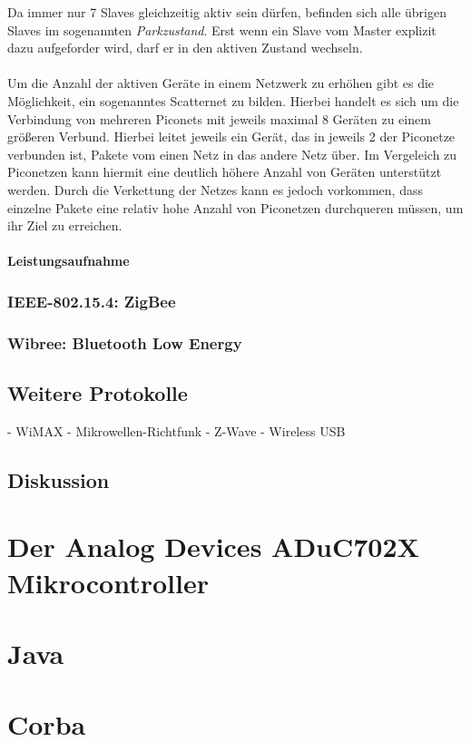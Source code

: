             Da immer nur 7 Slaves gleichzeitig aktiv sein dürfen, befinden sich 
            alle übrigen Slaves im sogenannten \textsl{Parkzustand}. Erst wenn
            ein Slave vom Master explizit dazu aufgeforder wird, darf er in den
            aktiven Zustand wechseln. \\
            \\
            Um die Anzahl der aktiven Geräte in einem Netzwerk zu erhöhen
            gibt es die Möglichkeit, ein sogenanntes Scatternet zu bilden.
            Hierbei handelt es sich um die Verbindung von mehreren Piconets
            mit jeweils maximal 8 Geräten zu einem größeren Verbund. Hierbei
            leitet jeweils ein Gerät, das in jeweils 2 der Piconetze 
            verbunden ist, Pakete vom einen Netz in das andere Netz über.
            Im Vergeleich zu Piconetzen kann hiermit eine deutlich höhere
            Anzahl von Geräten unterstützt werden. Durch die Verkettung 
            der Netzes kann es jedoch vorkommen, dass einzelne Pakete
            eine relativ hohe Anzahl von Piconetzen durchqueren müssen,
            um ihr Ziel zu erreichen.


        \paragraph{Leistungsaufnahme}
    \subsubsection{IEEE-802.15.4: ZigBee}
    \subsubsection{Wibree: Bluetooth Low Energy}\label{wibree}
    \subsection{Weitere Protokolle}
        - WiMAX
        - Mikrowellen-Richtfunk
        - Z-Wave
        - Wireless USB

    \subsection{Diskussion}

\section{Der Analog Devices ADuC702X Mikrocontroller}
\section{Java}
\section{Corba}
